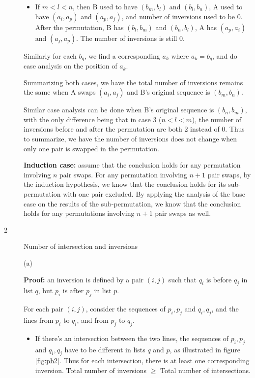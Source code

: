 \documentclass{article}
\begin{document}
\begin{description}
\begin{itemize}
  \item
  If $m < l < n$, then B used to have $(b_m, b_l)$ and $(b_l, b_n)$, A used to have $(a_i, a_p)$ and $(a_p, a_j)$, and number of inversions used to be 0. After the permutation, B has $(b_l, b_m)$ and $(b_n, b_l)$, A has $(a_p, a_i)$ and $(a_j, a_p)$. The number of inversions is still 0.
  \end{itemize}

  Similarly for each $b_q$, we find a corresponding $a_k$ where $a_k = b_q$, and do case analysis on the position of $a_k$. 

  Summarizing both cases, we have the total number of inversions remains the same when A swaps $(a_i, a_j)$ and B's original sequence is $(b_m, b_n)$.

  Similar case analysis can be done when B's original sequence is $(b_n, b_m)$, with the only difference being that in case 3 ($n < l < m$), the number of inversions before and after the permutation are both 2 instead of 0. Thus to summarize, we have the number of inversions does not change when only one pair is swapped in the permutation.

  \textbf{Induction case:} assume that the conclusion holds for any permutation involving $n$ pair swaps. For any permutation involving $n+1$ pair swaps, by the induction hypothesis, we know that the conclusion holds for its sub-permutation with one pair excluded. By applying the analysis of the base case on the results of the sub-permutation, we know that the conclusion holds for any permutations involving $n+1$ pair swaps as well.
  

\item[2]{Number of intersection and inversions}

  (a)

  \textbf{Proof:} an inversion is defined by a pair $(i, j)$ such that $q_i$ is before $q_j$ in list $q$, but $p_i$ is after $p_j$ in list $p$. 

  For each pair $(i, j)$, consider the sequences of $p_i, p_j$ and $q_i, q_j$, and the lines from $p_i$ to $q_i$, and from $p_j$ to $q_j$. 

  \begin{itemize}
  \item
  If there's an intersection between the two lines, the sequences of $p_i, p_j$ and $q_i, q_j$ have to be different in lists $q$ and $p$, as illustrated in figure \ref{fig:pb2}. Thus for each intersection, there is at least one corresponding inversion. Total number of inversions $\geq$ Total number of intersections.


\end{itemize}
\end{description}
\end{document}
